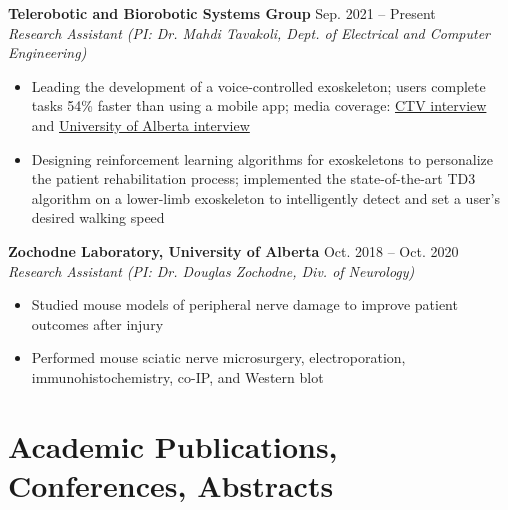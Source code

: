 \documentclass{article}
\begin{document}
\textbf{Telerobotic and Biorobotic Systems Group} \hfill Sep. 2021 -- Present\\
\textit{Research Assistant (PI: Dr. Mahdi Tavakoli, Dept. of Electrical and Computer Engineering)}
\begin{itemize}
    \item Leading the development of a voice-controlled exoskeleton; users complete tasks 54\% faster than using a mobile app; media coverage: \href{https://edmonton.ctvnews.ca/u-of-a-integrating-artificial-intelligence-into-exoskeleton-technology-1.6019787}{CTV interview} and \href{https://www.linkedin.com/posts/university-of-alberta_ai-voice-controlled-exoskeleton-activity-6954902847477997568-CTf4?utm_source=linkedin_share&utm_medium=member_desktop_web}{University of Alberta interview}
    \item Designing reinforcement learning algorithms for exoskeletons to personalize the patient rehabilitation process; implemented the state-of-the-art TD3 algorithm on a lower-limb exoskeleton to intelligently detect and set a user's desired walking speed
\end{itemize} \vspace{1em}

\textbf{Zochodne Laboratory, University of Alberta} \hfill Oct. 2018 -- Oct. 2020 \\
\textit{Research Assistant (PI: Dr. Douglas Zochodne, Div. of Neurology)}
\begin{itemize}
    \item Studied mouse models of peripheral nerve damage to improve patient outcomes after injury
    \item Performed mouse sciatic nerve microsurgery, electroporation, immunohistochemistry, co-IP, and Western blot
\end{itemize}


\section*{\textcolor{my_colour}{Academic Publications, Conferences, Abstracts}}
\vspace{-.25em} \hrulefill \vspace{.25em}
\end{document}
